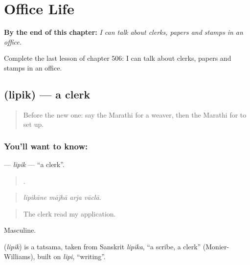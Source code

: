 
\chapter{Office Life}
\label{ch:mr-office-life}

\begin{chapteropening}
\textbf{By the end of this chapter:} \emph{I can talk about clerks, papers and stamps in an office.}

Complete the last lesson of chapter 506: I can talk about clerks, papers and stamps in an office.
\end{chapteropening}

\section[\texorpdfstring{\mr{लिपिक} (lipik)}{लिपिक (lipik)}]{ (lipik) — a clerk}

\label{lesson:MR-C506-lipik}



\begin{quote}
Before the new one: say the Marathi for a weaver, then the Marathi for to set up.
\end{quote}

\subsection*{You'll want to know: }
\textbf{} — \emph{lipik} — \textquotedblleft{}a clerk\textquotedblright{}.

\begin{quote}
   .
\end{quote}

\begin{quote}
\emph{lipikāne mājhā arja vāclā.}
\end{quote}

\begin{quote}
The clerk read my application.
\end{quote}

Masculine.

\begin{cousinweb}
\textbf{} (\emph{lipik}) is a tatsama, taken from Sanskrit \emph{lipika}, \textquotedblleft{}a scribe, a clerk\textquotedblright{} (Monier-Williams), built on \emph{lipi}, \textquotedblleft{}writing\textquotedblright{}.
\end{cousinweb}

